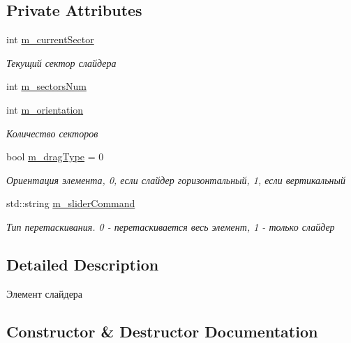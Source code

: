 \subsection*{Private Attributes}
\begin{DoxyCompactItemize}
\item 
int \hyperlink{class_slider_element_class_a1843fbdee51834cdff0dc293d49b91e3}{m\+\_\+current\+Sector}
\begin{DoxyCompactList}\small\item\em Текущий сектор слайдера \end{DoxyCompactList}\item 
int \hyperlink{class_slider_element_class_a448bd7d931bde696c4f1cd37b6c358d5}{m\+\_\+sectors\+Num}
\item 
int \hyperlink{class_slider_element_class_a3db339a7b6ddca3efa94c84261727792}{m\+\_\+orientation}
\begin{DoxyCompactList}\small\item\em Количество секторов \end{DoxyCompactList}\item 
bool \hyperlink{class_slider_element_class_aa4784e7ba59987b2fc4df4f1c0280dbe}{m\+\_\+drag\+Type} = 0
\begin{DoxyCompactList}\small\item\em Ориентация элемента, 0, если слайдер горизонтальный, 1, если вертикальный \end{DoxyCompactList}\item 
std\+::string \hyperlink{class_slider_element_class_afb25db0a3044ffd74f3994710531ad38}{m\+\_\+slider\+Command}
\begin{DoxyCompactList}\small\item\em Тип перетаскивания. 0 -\/ перетаскивается весь элемент, 1 -\/ только слайдер \end{DoxyCompactList}\end{DoxyCompactItemize}


\subsection{Detailed Description}
Элемент слайдера 

\subsection{Constructor \& Destructor Documentation}
\mbox{\label{class_slider_element_class_ab0a21e050e168c093acaacdd08f42485}} 
